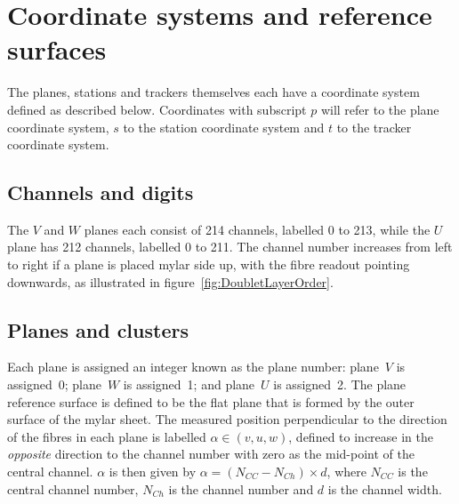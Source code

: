 \section{Coordinate systems and reference surfaces}
\label{sec:Coordinates}

  The planes, stations and trackers themselves each have a coordinate system defined as described below. Coordinates with subscript $p$ will refer to the plane coordinate system, $s$ to the station coordinate system and $t$ to the tracker coordinate system.

  \subsection{Channels and digits}
  The $V$ and $W$ planes each consist of 214 channels, labelled 0 to 213, while the $U$ plane has 212 channels, labelled 0 to 211.  The channel number increases from left to right if a plane is placed mylar side up, with the fibre readout pointing downwards, as illustrated in figure~\ref{fig:DoubletLayerOrder}.

  \subsection{Planes and clusters}
  \label{subsec:PlaneAndClusters}
  Each plane is assigned an integer known as the plane number: plane~$V$ is assigned~0; plane~$W$ is assigned~1; and plane~$U$ is assigned~2.  The plane reference surface is defined to be the flat plane that is formed by the outer surface of the mylar sheet. The measured position perpendicular to the direction of the fibres in each plane is labelled  $\alpha \in (v, u, w)$, defined to increase in the \textit{opposite} direction to the channel number with zero as the mid-point of the central channel. $\alpha$ is then given by $\alpha = \left(N_{CC} - N_{Ch}\right) \times d$, where $N_{CC}$ is the central channel number, $N_{Ch}$ is the channel number and $d$ is the channel width.
  
% 
  
